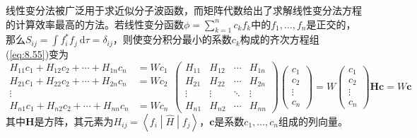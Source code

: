     线性变分法被广泛用于求近似分子波函数，而矩阵代数给出了求解线性变分法方程的计算效率最高的方法。若线性变分函数$\phi = \sum_{k=1}^{n}c_kf_k$中的$f_1,\ldots,f_n$是正交的，那么$S_{ij} = \int f_i^{\ast}f_j\:\mathrm{d}\tau = \delta_{ij}$，则使变分积分最小的系数$c_k$构成的齐次方程组(\ref{eq:8.55})变为
    \begin{subequations}
        \label{eq:8.79}
        \begin{equation}
            \begin{aligned}
                H_{11}c_1 + H_{12}c_2 + \cdots + H_{1n}c_n &= Wc_1 \\
                H_{21}c_1 + H_{22}c_2 + \cdots + H_{2n}c_n &= Wc_2 \\
                \vdots \\
                H_{n1}c_1 + H_{n2}c_2 + \cdots + H_{nn}c_n &= Wc_n
            \end{aligned}
            \tag{8.79a}
            \label{eq:8.79a}
        \end{equation}
        \begin{equation}
            \begin{pmatrix}
                H_{11} & H_{12} & \cdots & H_{1n} \\
                H_{21} & H_{22}& \cdots & H_{2n} \\
                \vdots & \vdots & \ddots & \vdots \\
                H_{n1} & H_{n2} & \cdots & H_{nn}
            \end{pmatrix} \begin{pmatrix}
                c_1 \\
                c_2 \\
                \vdots \\
                c_n
            \end{pmatrix} = W\begin{pmatrix}
                c_1 \\
                c_2 \\
                \vdots \\
                c_n
            \end{pmatrix}
            \tag{8.79b}
            \label{eq:8.79b}
        \end{equation}
        \begin{equation}
            \mathbf{H}\mathbf{c} = W\mathbf{c}
            \tag{8.79c}
            \label{eq:8.79c}
        \end{equation}
    \end{subequations}
    其中$\mathbf{H}$是方阵，其元素为$H_{ij} = \left\langle f_i \middle| \hat{H} \middle| f_j \right\rangle$，$\mathbf{c}$是系数$c_1,\ldots,c_n$组成的列向量。

